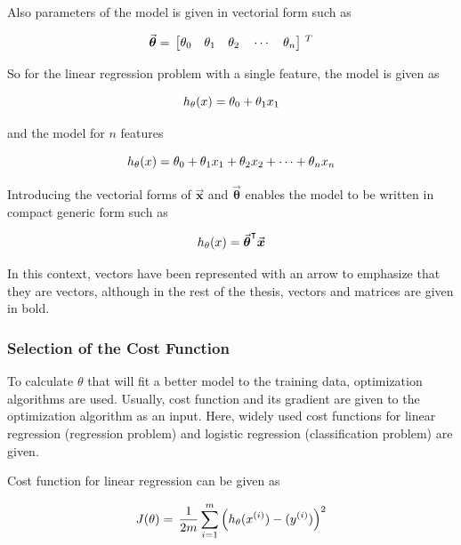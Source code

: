 Also parameters of the model is given in vectorial form such as

\begin{equation}{\label{eqn:parameterVector}}
\vec{\bm{\theta}}
=\,
\begin{bmatrix}
\theta_0\quad \theta_1 \quad  \theta_2 \quad \cdots \quad \theta_n 
\end{bmatrix}
\,^T
\end{equation} 

So for the linear regression problem with a single feature, the model is given as

\begin{equation}{\label{eqn:costFuncOneFeature}}
h_{\theta}(x) = \theta_0 + \theta_1 x_1
\end{equation} 

and the model for $n$ features

\begin{equation}{\label{eqn:costFuncMltplFeature}}
h_{\theta}(x) = \theta_0 + \theta_1 x_1 + \theta_2 x_2 + \cdots+ \theta_n x_n
\end{equation}

Introducing the vectorial forms of $\vec{\bm{x}}$ and $\vec{\bm{\theta}}$ enables the model to be written in compact generic form such as 

\begin{equation}{\label{eqn:costFuncMltplFeature}}
h_{\theta}(x) = {\vec{\bm{\theta}}}^\intercal \vec{\bm{x}}
\end{equation}

In this context, vectors have been represented with an arrow to emphasize that they are vectors, although in the rest of the thesis, vectors and matrices are given in bold.

\subsubsection{Selection of the Cost Function}

To calculate $\theta$ that will fit a better model to the training data, optimization algorithms are used.
Usually, cost function and its gradient are given to the optimization algorithm as an input. 
Here, widely used cost functions for linear regression (regression problem) and logistic regression (classification problem) are given. 

Cost function for linear regression can be given as

\begin{equation}{\label{eqn:costFuncLinearRegression}}
J(\theta)
=\,
\frac{1}{2m} \sum\limits_{i=1}^{m} \Big(h_\theta(x^{(i)}) - (y^{(i)})\Big)^2  
\end{equation} 

